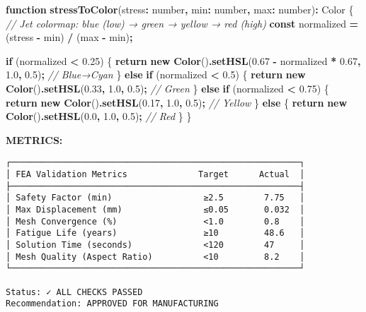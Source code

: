 \documentclass[
]{article}
\newenvironment{Shaded}{\begin{snugshade}}{\end{snugshade}}
\newcommand{\CommentTok}[1]{\textcolor[rgb]{0.56,0.35,0.01}{\textit{#1}}}
\newcommand{\ControlFlowTok}[1]{\textcolor[rgb]{0.13,0.29,0.53}{\textbf{#1}}}
\newcommand{\DataTypeTok}[1]{\textcolor[rgb]{0.13,0.29,0.53}{#1}}
\newcommand{\FloatTok}[1]{\textcolor[rgb]{0.00,0.00,0.81}{#1}}
\newcommand{\FunctionTok}[1]{\textcolor[rgb]{0.13,0.29,0.53}{\textbf{#1}}}
\newcommand{\KeywordTok}[1]{\textcolor[rgb]{0.13,0.29,0.53}{\textbf{#1}}}
\newcommand{\NormalTok}[1]{#1}
\newcommand{\OperatorTok}[1]{\textcolor[rgb]{0.81,0.36,0.00}{\textbf{#1}}}
\begin{document}
\begin{Shaded}
\begin{Highlighting}[]
\KeywordTok{function} \FunctionTok{stressToColor}\NormalTok{(stress}\OperatorTok{:} \DataTypeTok{number}\OperatorTok{,}\NormalTok{ min}\OperatorTok{:} \DataTypeTok{number}\OperatorTok{,}\NormalTok{ max}\OperatorTok{:} \DataTypeTok{number}\NormalTok{)}\OperatorTok{:}\NormalTok{ Color \{}
  \CommentTok{// Jet colormap: blue (low) → green → yellow → red (high)}
  \KeywordTok{const}\NormalTok{ normalized }\OperatorTok{=}\NormalTok{ (stress }\OperatorTok{{-}}\NormalTok{ min) }\OperatorTok{/}\NormalTok{ (max }\OperatorTok{{-}}\NormalTok{ min)}\OperatorTok{;}

  \ControlFlowTok{if}\NormalTok{ (normalized }\OperatorTok{\textless{}} \FloatTok{0.25}\NormalTok{) \{}
    \ControlFlowTok{return} \KeywordTok{new} \FunctionTok{Color}\NormalTok{()}\OperatorTok{.}\FunctionTok{setHSL}\NormalTok{(}\FloatTok{0.67} \OperatorTok{{-}}\NormalTok{ normalized }\OperatorTok{*} \FloatTok{0.67}\OperatorTok{,} \FloatTok{1.0}\OperatorTok{,} \FloatTok{0.5}\NormalTok{)}\OperatorTok{;}  \CommentTok{// Blue→Cyan}
\NormalTok{  \} }\ControlFlowTok{else} \ControlFlowTok{if}\NormalTok{ (normalized }\OperatorTok{\textless{}} \FloatTok{0.5}\NormalTok{) \{}
    \ControlFlowTok{return} \KeywordTok{new} \FunctionTok{Color}\NormalTok{()}\OperatorTok{.}\FunctionTok{setHSL}\NormalTok{(}\FloatTok{0.33}\OperatorTok{,} \FloatTok{1.0}\OperatorTok{,} \FloatTok{0.5}\NormalTok{)}\OperatorTok{;}  \CommentTok{// Green}
\NormalTok{  \} }\ControlFlowTok{else} \ControlFlowTok{if}\NormalTok{ (normalized }\OperatorTok{\textless{}} \FloatTok{0.75}\NormalTok{) \{}
    \ControlFlowTok{return} \KeywordTok{new} \FunctionTok{Color}\NormalTok{()}\OperatorTok{.}\FunctionTok{setHSL}\NormalTok{(}\FloatTok{0.17}\OperatorTok{,} \FloatTok{1.0}\OperatorTok{,} \FloatTok{0.5}\NormalTok{)}\OperatorTok{;}  \CommentTok{// Yellow}
\NormalTok{  \} }\ControlFlowTok{else}\NormalTok{ \{}
    \ControlFlowTok{return} \KeywordTok{new} \FunctionTok{Color}\NormalTok{()}\OperatorTok{.}\FunctionTok{setHSL}\NormalTok{(}\FloatTok{0.0}\OperatorTok{,} \FloatTok{1.0}\OperatorTok{,} \FloatTok{0.5}\NormalTok{)}\OperatorTok{;}  \CommentTok{// Red}
\NormalTok{  \}}
\NormalTok{\}}
\end{Highlighting}
\end{Shaded}

\textbf{METRICS:}

\begin{verbatim}
┌─────────────────────────────────────────────────────────┐
│ FEA Validation Metrics              Target      Actual  │
├─────────────────────────────────────────────────────────┤
│ Safety Factor (min)                  ≥2.5        7.75   │
│ Max Displacement (mm)                ≤0.05       0.032  │
│ Mesh Convergence (%)                 <1.0        0.8    │
│ Fatigue Life (years)                 ≥10         48.6   │
│ Solution Time (seconds)              <120        47     │
│ Mesh Quality (Aspect Ratio)          <10         8.2    │
└─────────────────────────────────────────────────────────┘

Status: ✓ ALL CHECKS PASSED
Recommendation: APPROVED FOR MANUFACTURING
\end{verbatim}
\end{document}

